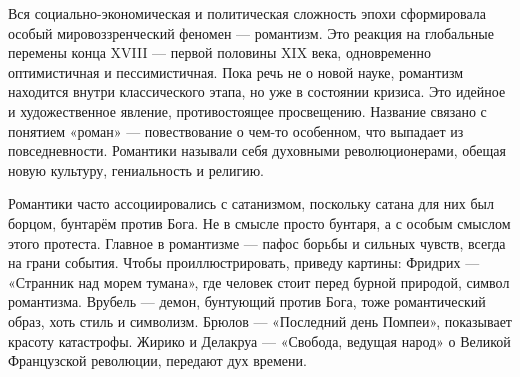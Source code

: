 
Вся социально-экономическая и политическая сложность эпохи сформировала особый мировоззренческий феномен --- романтизм. Это реакция на глобальные перемены конца XVIII --- первой половины XIX века, одновременно оптимистичная и пессимистичная. Пока речь не о новой науке, романтизм находится внутри классического этапа, но уже в состоянии кризиса. Это идейное и художественное явление, противостоящее просвещению. Название связано с понятием «роман» --- повествование о чем-то особенном, что выпадает из повседневности. Романтики называли себя духовными революционерами, обещая новую культуру, гениальность и религию.

Романтики часто ассоциировались с сатанизмом, поскольку сатана для них был борцом, бунтарём против Бога. Не в смысле просто бунтаря, а с особым смыслом этого протеста. Главное в романтизме --- пафос борьбы и сильных чувств, всегда на грани события. Чтобы проиллюстрировать, приведу картины: Фридрих --- «Странник над морем тумана», где человек стоит перед бурной природой, символ романтизма. Врубель --- демон, бунтующий против Бога, тоже романтический образ, хоть стиль и символизм. Брюлов --- «Последний день Помпеи», показывает красоту катастрофы. Жирико и Делакруа --- «Свобода, ведущая народ» о Великой Французской революции, передают дух времени.

